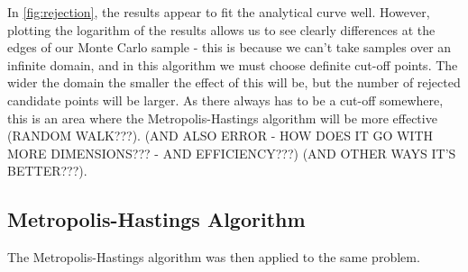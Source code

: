 \documentclass[a4paper,11pt,twoside]{article}
\begin{document}
In \cref{fig:rejection}, the results appear to fit the analytical curve well.
However, plotting the logarithm of the results allows us to see clearly differences at
the edges of our Monte Carlo sample - this is because we can't take samples over
an infinite domain, and in this algorithm we must choose definite cut-off
points. The wider the domain the smaller the effect of this will be, but the
number of rejected candidate points will be larger. As there always has to be a
cut-off somewhere, this is an area where the Metropolis-Hastings algorithm will
be more effective (RANDOM WALK???). (AND ALSO ERROR - HOW DOES IT GO WITH MORE
DIMENSIONS??? - AND
EFFICIENCY???) (AND OTHER WAYS IT'S BETTER???).

\subsection{Metropolis-Hastings Algorithm} 
The Metropolis-Hastings algorithm was then applied to the same problem. 
\end{document}
